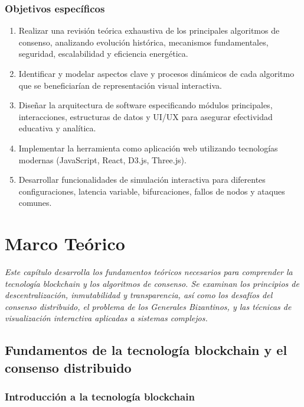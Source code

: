 \documentclass[spanish,12pt,letterpaper]{report}
\begin{document}
\subsection{Objetivos específicos}
\begin{enumerate}
    \item Realizar una revisión teórica exhaustiva de los principales algoritmos de consenso, analizando evolución histórica, mecanismos fundamentales, seguridad, escalabilidad y eficiencia energética.
    
    \item Identificar y modelar aspectos clave y procesos dinámicos de cada algoritmo que se beneficiarían de representación visual interactiva.
    
    \item Diseñar la arquitectura de software especificando módulos principales, interacciones, estructuras de datos y UI/UX para asegurar efectividad educativa y analítica.
    
    \item Implementar la herramienta como aplicación web utilizando tecnologías modernas (JavaScript, React, D3.js, Three.js).
    
    \item Desarrollar funcionalidades de simulación interactiva para diferentes configuraciones, latencia variable, bifurcaciones, fallos de nodos y ataques comunes.

\end{enumerate}

\chapter{Marco Teórico}

\textit{Este capítulo desarrolla los fundamentos teóricos necesarios para comprender la tecnología blockchain y los algoritmos de consenso. Se examinan los principios de descentralización, inmutabilidad y transparencia, así como los desafíos del consenso distribuido, el problema de los Generales Bizantinos, y las técnicas de visualización interactiva aplicadas a sistemas complejos.}

\newpage

\section{Fundamentos de la tecnología blockchain y el consenso distribuido}

\subsection{Introducción a la tecnología blockchain}
\end{document}
